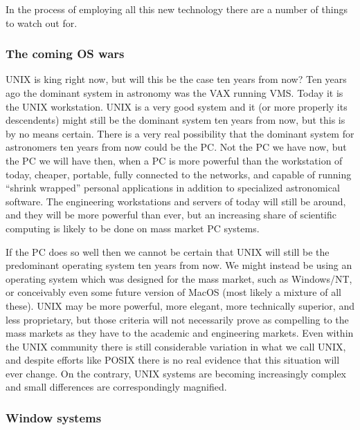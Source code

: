 In the process of employing all this new technology there are a number of
things to watch out for.

\subsubsection {The coming OS wars}

UNIX is king right now, but will this be the case ten years from now?  Ten
years ago the dominant system in astronomy was the VAX running VMS.  Today
it is the UNIX workstation.  UNIX is a very good system and it (or more
properly its descendents) might still be the dominant system ten years from
now, but this is by no means certain.  There is a very real possibility that
the dominant system for astronomers ten years from now could be the PC.  Not
the PC we have now, but the PC we will have then, when a PC is more powerful
than the workstation of today, cheaper, portable, fully connected to the
networks, and capable of running ``shrink wrapped'' personal applications in
addition to specialized astronomical software.  The engineering workstations
and servers of today will still be around, and they will be more powerful
than ever, but an increasing share of scientific computing is likely to be
done on mass market PC systems.

If the PC does so well then we cannot be certain that UNIX will still be the
predominant operating system ten years from now.  We might instead be using
an operating system which was designed for the mass market, such as
Windows/NT, or conceivably even some future version of MacOS (most likely a
mixture of all these).  UNIX may be more powerful, more elegant, more
technically superior, and less proprietary, but those criteria will not
necessarily prove as compelling to the mass markets as they have to the
academic and engineering markets.  Even within the UNIX community there is
still considerable variation in what we call UNIX, and despite efforts like
POSIX there is no real evidence that this situation will ever change.  On
the contrary, UNIX systems are becoming increasingly complex and small
differences are correspondingly magnified.

\subsubsection {Window systems}


